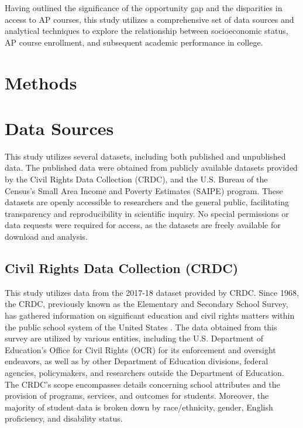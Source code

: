 \documentclass[sn-mathphys-num]{sn-jnl}%
\theoremstyle{thmstyleone}%
\theoremstyle{thmstyletwo}%
\theoremstyle{thmstylethree}%
\begin{document}
Having outlined the significance of the opportunity gap and the disparities in access to AP courses, this study utilizes a comprehensive set of data sources and analytical techniques to explore the relationship between socioeconomic status, AP course enrollment, and subsequent academic performance in college. %

\section{Methods}\label{sec:Methods}
\section{Data Sources}
This study utilizes several datasets, including both published and unpublished data. The published data were obtained from publicly available datasets provided by the Civil Rights Data Collection (CRDC), and the U.S. Bureau of the Census's Small Area Income and Poverty Estimates (SAIPE) program. These datasets are openly accessible to researchers and the general public, facilitating transparency and reproducibility in scientific inquiry. No special permissions or data requests were required for access, as the datasets are freely available for download and analysis. %

\subsection{Civil Rights Data Collection (CRDC)}
This study utilizes data from the 2017-18 dataset provided by CRDC. Since 1968, the CRDC, previously known as the Elementary and Secondary School Survey, has gathered information on significant education and civil rights matters within the public school system of the United States \cite{crdc_manual}. The data obtained from this survey are utilized by various entities, including the U.S. Department of Education’s Office for Civil Rights (OCR) for its enforcement and oversight endeavors, as well as by other Department of Education divisions, federal agencies, policymakers, and researchers outside the Department of Education. The CRDC's scope encompasses details concerning school attributes and the provision of programs, services, and outcomes for students. Moreover, the majority of student data is broken down by race/ethnicity, gender, English proficiency, and disability status.\\
\end{document}
